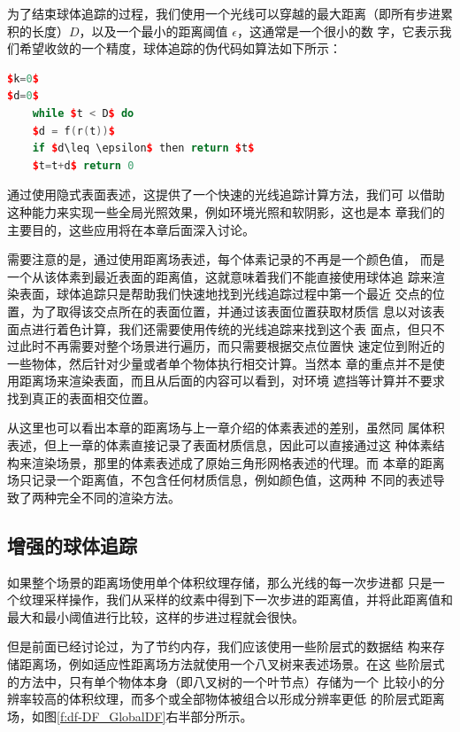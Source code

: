 为了结束球体追踪的过程，我们使用一个光线可以穿越的最大距离（即所有步进累积的长度）$D$，以及一个最小的距离阈值 $\epsilon$，这通常是一个很小的数 字，它表示我们希望收敛的一个精度，球体追踪的伪代码如算法如下所示：

\begin{lstlisting}[language=C++, mathescape=true]
$k=0$
$d=0$
	while $t < D$ do
	$d = f(r(t))$
	if $d\leq \epsilon$ then return $t$
	$t=t+d$ return 0
\end{lstlisting}

通过使用隐式表面表述，这提供了一个快速的光线追踪计算方法，我们可 以借助这种能力来实现一些全局光照效果，例如环境光照和软阴影，这也是本 章我们的主要目的，这些应用将在本章后面深入讨论。

需要注意的是，通过使用距离场表述，每个体素记录的不再是一个颜色值， 而是一个从该体素到最近表面的距离值，这就意味着我们不能直接使用球体追 踪来渲染表面，球体追踪只是帮助我们快速地找到光线追踪过程中第一个最近 交点的位置，为了取得该交点所在的表面位置，并通过该表面位置获取材质信 息以对该表面点进行着色计算，我们还需要使用传统的光线追踪来找到这个表 面点，但只不过此时不再需要对整个场景进行遍历，而只需要根据交点位置快 速定位到附近的一些物体，然后针对少量或者单个物体执行相交计算。当然本 章的重点并不是使用距离场来渲染表面，而且从后面的内容可以看到，对环境 遮挡等计算并不要求找到真正的表面相交位置。

从这里也可以看出本章的距离场与上一章介绍的体素表述的差别，虽然同 属体积表述，但上一章的体素直接记录了表面材质信息，因此可以直接通过这 种体素结构来渲染场景，那里的体素表述成了原始三角形网格表述的代理。而 本章的距离场只记录一个距离值，不包含任何材质信息，例如颜色值，这两种 不同的表述导致了两种完全不同的渲染方法。



\subsection{增强的球体追踪}
如果整个场景的距离场使用单个体积纹理存储，那么光线的每一次步进都 只是一个纹理采样操作，我们从采样的纹素中得到下一次步进的距离值，并将此距离值和最大和最小阈值进行比较，这样的步进过程就会很快。

但是前面已经讨论过，为了节约内存，我们应该使用一些阶层式的数据结 构来存储距离场，例如适应性距离场方法就使用一个八叉树来表述场景。在这 些阶层式的方法中，只有单个物体本身（即八叉树的一个叶节点）存储为一个 比较小的分辨率较高的体积纹理，而多个或全部物体被组合以形成分辨率更低 的阶层式距离场，如图\ref{f:df-DF_GlobalDF}右半部分所示。

